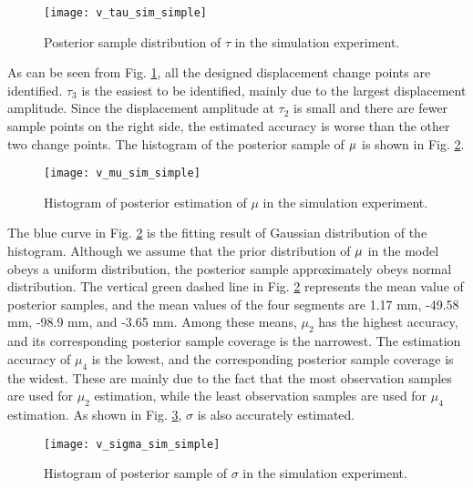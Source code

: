 \documentclass[journal]{IEEEtran}
\begin{document}
\begin{figure}[htbp]
	\centering
	\texttt{[image: v\_tau\_sim\_simple]}
	\caption{Posterior sample distribution of $\tau$ in the simulation experiment.}
	\label{fig_v_tau_sim_simple}
\end{figure} 
As can be seen from Fig. \ref{fig_v_tau_sim_simple}, all the designed displacement change points are identified. 
$\tau_3$ is the easiest to be identified, mainly due to the largest displacement amplitude. 
Since the displacement amplitude at $\tau_2$ is small and there are fewer sample points on the right side, the estimated accuracy is worse than the other two change points.
The histogram of the posterior sample of $\bf{\mu}$ is shown in Fig. \ref{fig_v_mu_sim_simple}.

\begin{figure}[htbp]
	\centering
	\texttt{[image: v\_mu\_sim\_simple]}
	\caption{Histogram of posterior estimation of $\mu$ in the simulation experiment.}
	\label{fig_v_mu_sim_simple}
\end{figure} 
The blue curve in Fig. \ref{fig_v_mu_sim_simple} is the fitting result of Gaussian distribution of the histogram.
Although we assume that the prior distribution of $\bf{\mu}$ in the model obeys a uniform distribution, the posterior sample approximately obeys normal distribution. 
The vertical green dashed line in Fig. \ref{fig_v_mu_sim_simple} represents the mean value of posterior samples, and the mean values of the four segments are 1.17 mm, -49.58 mm, -98.9 mm, and -3.65 mm.
Among these means, $\mu_2$ has the highest accuracy, and its corresponding posterior sample coverage is the narrowest. 
The estimation accuracy of $\mu_4$ is the lowest, and the corresponding posterior sample coverage is the widest. 
These are mainly due to the fact that the most observation samples are used for $\mu_2$ estimation, while the least observation samples are used for $\mu_4$ estimation. 
As shown in Fig. \ref{fig_v_sigma_sim_simple}, $\sigma$ is also accurately estimated.

\begin{figure}[htbp]
	\centering
	\texttt{[image: v\_sigma\_sim\_simple]}
	\caption{Histogram of posterior sample of $\sigma$ in the simulation experiment.}
	\label{fig_v_sigma_sim_simple}
\end{figure} 
\end{document}
